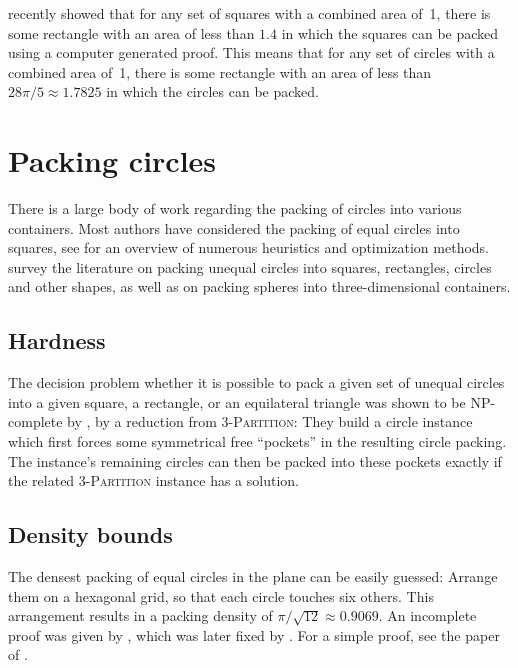 \documentclass[a4paper,style=print,oneside,bibliography=totoc,nexus,lnum,extramargin]{tubsbook}
\begin{document}
\textcite{hougardy2011packing} recently showed that for any set of squares with a combined area of~1, there is some rectangle with an area of less than $1.4$ in which the squares can be packed using a computer generated proof. This means that for any set of circles with a combined area of~1, there is some rectangle with an area of less than $28\pi/5 \approx 1.7825$ in which the circles can be packed.

\section{Packing circles}

There is a large body of work regarding the packing of circles into various containers. Most authors have considered the packing of equal circles into squares, see \textcite{SMCSCG2007new} for an overview of numerous heuristics and optimization methods. \textcite{HM2009literature} survey the literature on packing unequal circles into squares, rectangles, circles and other shapes, as well as on packing spheres into three-dimensional containers.


\subsection{Hardness}

The decision problem whether it is possible to pack a given set of unequal circles into a given square, a rectangle, or an equilateral triangle was shown to be NP-complete by \textcite{DFL2010circle}, by a reduction from \textsc{3-Partition}: They build a circle instance which first forces some symmetrical free “pockets” in the resulting circle packing. The instance's remaining circles can then be packed into these pockets exactly if the related \textsc{3-Partition} instance has a solution.

\subsection{Density bounds}

The densest packing of equal circles in the plane can be easily guessed: Arrange them on a hexagonal grid, so that each circle touches six others. This arrangement results in a packing density of $\pi/\sqrt{12} \approx 0.9069$. An incomplete proof was given by \textcite{thue1892om}, which was later fixed by \textcite{fejestoth1940uber}. For a simple proof, see the paper of \textcite{CW2010simple}.
\end{document}
